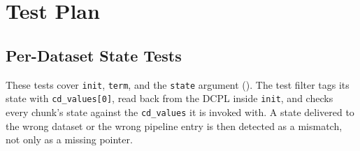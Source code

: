 \documentclass[../RFC-HDFG-2026-003.tex]{subfiles}
\begin{document}
\section{Test Plan}
\label{sec:test-plan}

\subsection{Per-Dataset State Tests}
\label{sec:test-filter-state}

These tests cover \texttt{init}, \texttt{term}, and the \texttt{state}
argument ().  The test filter tags its
state with \texttt{cd\_values[0]}, read back from the DCPL inside
\texttt{init}, and checks every chunk's state against the
\texttt{cd\_values} it is invoked with.  A state delivered to the wrong
dataset or the wrong pipeline entry is then detected as a mismatch, not
only as a missing pointer.
\end{document}
